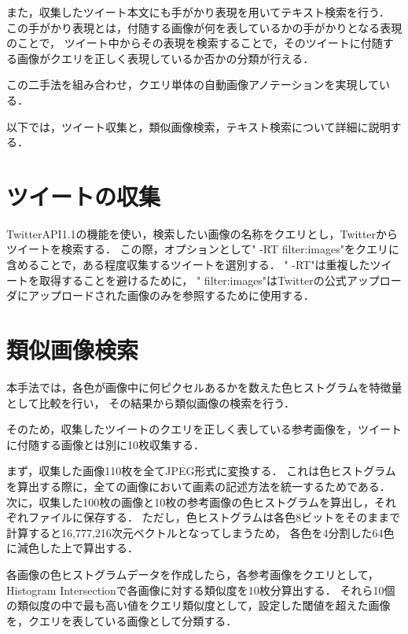 また，収集したツイート本文にも手がかり表現を用いてテキスト検索を行う．
この手がかり表現とは，付随する画像が何を表しているかの手がかりとなる表現のことで，
ツイート中からその表現を検索することで，そのツイートに付随する画像がクエリを正しく表現しているか否かの分類が行える．

この二手法を組み合わせ，クエリ単体の自動画像アノテーションを実現している．

以下では，ツイート収集と，類似画像検索，テキスト検索について詳細に説明する．

\section{ツイートの収集}
TwitterAPI1.1の機能を使い，検索したい画像の名称をクエリとし，Twitterからツイートを検索する．
この際，オプションとして" -RT filter:images"をクエリに含めることで，ある程度収集するツイートを選別する．
" -RT"は重複したツイートを取得することを避けるために，
" filter:images"はTwitterの公式アップローダにアップロードされた画像のみを参照するために使用する．

\section{類似画像検索}
本手法では，各色が画像中に何ピクセルあるかを数えた色ヒストグラムを特徴量として比較を行い，
その結果から類似画像の検索を行う．

そのため，収集したツイートのクエリを正しく表している参考画像を，ツイートに付随する画像とは別に10枚収集する．

まず，収集した画像110枚を全てJPEG形式に変換する．
これは色ヒストグラムを算出する際に，全ての画像において画素の記述方法を統一するためである．
次に，収集した100枚の画像と10枚の参考画像の色ヒストグラムを算出し，それぞれファイルに保存する．
ただし，色ヒストグラムは各色8ビットをそのままで計算すると16,777,216次元ベクトルとなってしまうため，
各色を4分割した64色に減色した上で算出する．

各画像の色ヒストグラムデータを作成したら，各参考画像をクエリとして，
Histogram Intersectionで各画像に対する類似度を10枚分算出する．
それら10個の類似度の中で最も高い値をクエリ類似度として，設定した閾値を超えた画像を，クエリを表している画像として分類する．
